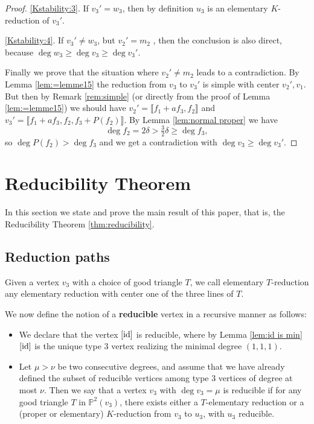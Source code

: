 \documentclass[reqno,oneside,11pt]{amsart}
\theoremstyle{plain}
\theoremstyle{definition}
\newcommand{\p}{\mathbb{P}}
\newcommand{\id}{\text{\rm id}}
\newcommand{\llb}{\llbracket}
\newcommand{\rrb}{\rrbracket}
\newcommand{\lines}[1]{\p^2(#1)}
\renewcommand{\ge}{\geqslant}
\begin{document}
\begin{proof}
\ref{Kstability:3}. If $v_3' = w_3$, then by
definition $u_3$ is an elementary $K$-reduction of $v_3'$.

\ref{Kstability:4}. If $v_3' \neq w_3$, but $v_2' = m_2$ , then the conclusion
is also direct, because $\deg w_3 \ge \deg v_3 \ge \deg v_3'$.

Finally we prove that the situation where $v_2' \neq m_2$ leads to a
contradiction.
By Lemma \ref{lem:=lemme15} the reduction from $v_3$ to $v_3'$ is
simple with center $v_2', v_1$.
But then by Remark \ref{rem:simple} (or directly from the proof of Lemma
\ref{lem:=lemme15}) we should have $v_2' = \llb f_1+a f_3, f_2 \rrb$
and $v_3' = \llb f_1+ a f_3, f_2, f_3 + P(f_2) \rrb$.
By Lemma \ref{lem:normal proper} we have
$$\deg f_2 = 2\delta > \tfrac32 \delta \ge \deg f_3,$$
so $\deg P(f_2) > \deg f_3$ and we get a contradiction with $\deg v_3 \ge \deg
v_3'$.
\end{proof}


\section{Reducibility Theorem} \label{sec:reducibility theorem}

In this section we state and prove the main result of this paper, that is, the Reducibility Theorem \ref{thm:reducibility}.

\subsection{Reduction paths}

Given a vertex $v_3$ with a choice of good triangle $T$, we call elementary
$T$-reduction any elementary reduction with center one of the three lines of
$T$.

We now define the notion of a \textbf{reducible} vertex in a recursive manner as follows:
\begin{itemize}[wide]
\item We declare that the vertex $[\id]$ is reducible, where by Lemma \ref{lem:id is min} $[\id]$ is the unique type 3 vertex realizing the minimal degree $(1,1,1)$.
\item Let $\mu > \nu$ be two consecutive degrees, and assume that we have already defined the subset of reducible vertices among type 3 vertices of degree at most $\nu$.
Then we say that a vertex $v_3$ with $\deg v_3 = \mu$ is reducible if for any
good triangle $T$ in $\lines{v_3}$, there exists either a $T$-elementary
reduction or a (proper or elementary) $K$-reduction  from $v_3$ to $u_3$, with
$u_3$ reducible.
\end{itemize}
\end{document}
